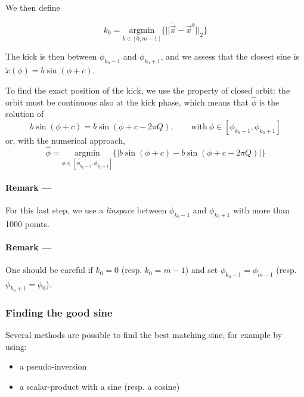 We then define

\begin{equation}
k_0 = \underset{k \in [0, m-1]}{\textrm{argmin}}\{||\tilde{\vec{x}}-\vec{x}^k||_2\}
\end{equation}

The kick is then between $\phi_{k_0-1}$ and $\phi_{k_0+1}$, and we assess that the closest sine is $\tilde{x}(\phi) = b \sin(\phi + c) $.

To find the exact position of the kick, we use the property of closed orbit: the orbit must be continuous also at the kick phase, which means that $\hat{\phi}$ is the solution of
\begin{equation}
b \sin(\phi + c) = b\sin(\phi+c-2 \pi Q), \qquad \mathrm{with}~ \phi \in [\phi_{k_0-1}, \phi_{k_0+1}]
\end{equation}
or, with the numerical approach, 
\begin{equation}
\hat{\phi} =  \underset{\phi \in [\phi_{k_0-1}, \phi_{k_0+1}]}{\textrm{argmin}}\{|b \sin(\phi + c) - b\sin(\phi+c-2 \pi Q)|\}
\end{equation}

\paragraph{Remark ---} For this last step, we use a \textit{linspace} between $\phi_{k_0-1}$ and $\phi_{k_0+1}$ with more than 1000 points.

\paragraph{Remark ---} One should be careful if $k_0 = 0$ (resp. $k_0 = m-1$) and set $\phi_{k_0-1} =\phi_{m-1}$ (resp. $\phi_{k_0+1} = \phi_{0}$). 

\subsubsection{Finding the good sine}
Several methods are possible to find the best matching sine, for example by using:
\begin{itemize}
	\item a pseudo-inversion
	\item a scalar-product with a sine (resp. a cosine)
\end{itemize}


